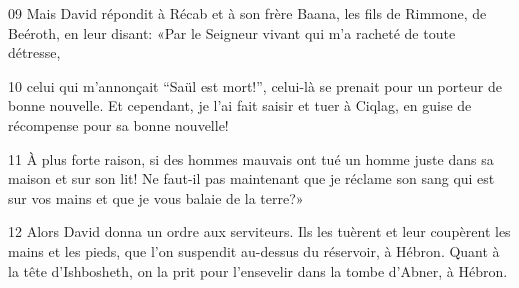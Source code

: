 
09 Mais David répondit à Récab et à son frère Baana, les fils de Rimmone, de Beéroth, en leur disant: «Par le Seigneur vivant qui m’a racheté de toute détresse,

10 celui qui m’annonçait “Saül est mort!”, celui-là se prenait pour un porteur de bonne nouvelle. Et cependant, je l’ai fait saisir et tuer à Ciqlag, en guise de récompense pour sa bonne nouvelle!

11 À plus forte raison, si des hommes mauvais ont tué un homme juste dans sa maison et sur son lit! Ne faut-il pas maintenant que je réclame son sang qui est sur vos mains et que je vous balaie de la terre?»

12 Alors David donna un ordre aux serviteurs. Ils les tuèrent et leur coupèrent les mains et les pieds, que l’on suspendit au-dessus du réservoir, à Hébron. Quant à la tête d’Ishbosheth, on la prit pour l’ensevelir dans la tombe d’Abner, à Hébron.